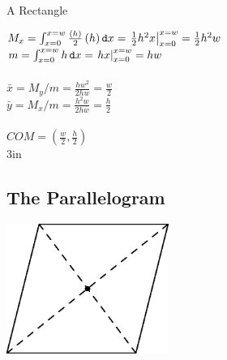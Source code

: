 \begin{exercise}{A Rectangle \Coffeecup \Coffeecup}
\begin{itemize}
{$M_x=\int_{x=0}^{x=w}\frac{\left(h\right)}{2}\left(h\right)\mathop{}\!\mathtt{d} x=\left.\frac{1}{2}h^2x\right|_{x=0}^{x=w}=\frac{1}{2}h^2w$ \\

$m=\int_{x=0}^{x=w}h\mathop{}\!\mathtt{d} x =\left.hx\right|_{x=0}^{x=w}=hw$\\
\\
$\bar{x}=M_y/m=\frac{hw^2}{2hw}=\frac{w}{2}$\\
$\bar{y}=M_x/m=\frac{h^2w}{2hw}=\frac{h}{2}$\\
\\
$COM=(\frac{w}{2},\frac{h}{2})$\\
}{3in}

\end{itemize}
\end{exercise}

\subsection{The Parallelogram}

	\begin{center}
		\includegraphics[width=150pt]{ChapterGeom/Figures/parallel.eps}
	\end{center}

